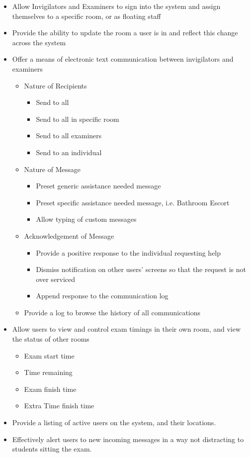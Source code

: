 \begin{itemize}
\item Allow Invigilators and Examiners to sign into the system and assign themselves to a specific room, or as floating staff

\item Provide the ability to update the room a user is in and reflect this change across the system

\item Offer a means of electronic text communication between invigilators and examiners
\begin{itemize}
\item Nature of Recipients
\begin{itemize}
\item Send to all
\item Send to all in specific room
\item Send to all examiners
\item Send to an individual
\end{itemize}
\item Nature of Message
\begin{itemize}
\item Preset generic assistance needed message
\item Preset specific assistance needed message, i.e. Bathroom Escort
\item Allow typing of custom messages
\end{itemize}
\item Acknowledgement of Message
\begin{itemize}
\item Provide a positive response to the individual requesting help
\item Dismiss notification on other users' screens so that the request is not over serviced
\item Append response to the communication log
\end{itemize}
\item Provide a log to browse the history of all communications
\end{itemize}

\item Allow users to view and control exam timings in their own room, and view the status of other rooms
\begin{itemize}
\item Exam start time
\item Time remaining
\item Exam finish time
\item Extra Time finish time
\end{itemize}

\item Provide a listing of active users on the system, and their locations.

\item Effectively alert users to new incoming messages in a way not distracting to students sitting the exam.

\end{itemize}

